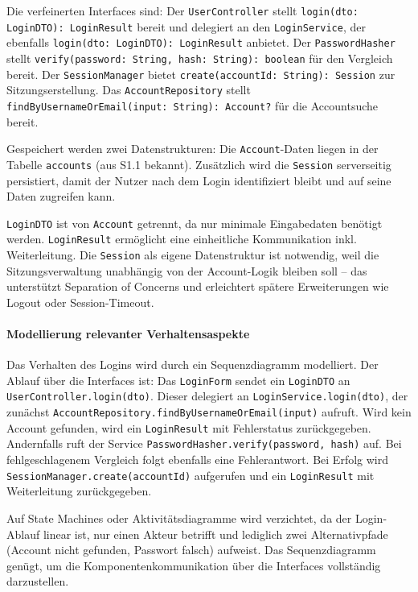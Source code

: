 \documentclass[a4paper,11pt]{article}
\begin{document}
Die verfeinerten Interfaces sind: Der \texttt{UserController} stellt \texttt{login(dto: LoginDTO): LoginResult} bereit und delegiert an den \texttt{LoginService}, der ebenfalls \texttt{login(dto: LoginDTO): LoginResult} anbietet. Der \texttt{PasswordHasher} stellt \texttt{verify(password: String, hash: String): boolean} für den Vergleich bereit. Der \texttt{SessionManager} bietet \texttt{create(accountId: String): Session} zur Sitzungserstellung. Das \texttt{AccountRepository} stellt \texttt{findByUsernameOrEmail(input: String): Account?} für die Accountsuche bereit.

Gespeichert werden zwei Datenstrukturen: Die \texttt{Account}-Daten liegen in der Tabelle \texttt{accounts} (aus S1.1 bekannt). Zusätzlich wird die \texttt{Session} serverseitig persistiert, damit der Nutzer nach dem Login identifiziert bleibt und auf seine Daten zugreifen kann.

\texttt{LoginDTO} ist von \texttt{Account} getrennt, da nur minimale Eingabedaten benötigt werden. \texttt{LoginResult} ermöglicht eine einheitliche Kommunikation inkl. Weiterleitung. Die \texttt{Session} als eigene Datenstruktur ist notwendig, weil die Sitzungsverwaltung unabhängig von der Account-Logik bleiben soll -- das unterstützt Separation of Concerns und erleichtert spätere Erweiterungen wie Logout oder Session-Timeout.

\paragraph{Modellierung relevanter Verhaltensaspekte}

Das Verhalten des Logins wird durch ein Sequenzdiagramm modelliert. Der Ablauf über die Interfaces ist: Das \texttt{LoginForm} sendet ein \texttt{LoginDTO} an \texttt{UserController.login(dto)}. Dieser delegiert an \texttt{LoginService.login(dto)}, der zunächst \texttt{AccountRepository.findByUsernameOrEmail(input)} aufruft. Wird kein Account gefunden, wird ein \texttt{LoginResult} mit Fehlerstatus zurückgegeben. Andernfalls ruft der Service \texttt{PasswordHasher.verify(password, hash)} auf. Bei fehlgeschlagenem Vergleich folgt ebenfalls eine Fehlerantwort. Bei Erfolg wird \texttt{SessionManager.create(accountId)} aufgerufen und ein \texttt{LoginResult} mit Weiterleitung zurückgegeben.

Auf State Machines oder Aktivitätsdiagramme wird verzichtet, da der Login-Ablauf linear ist, nur einen Akteur betrifft und lediglich zwei Alternativpfade (Account nicht gefunden, Passwort falsch) aufweist. Das Sequenzdiagramm genügt, um die Komponentenkommunikation über die Interfaces vollständig darzustellen.
\end{document}
